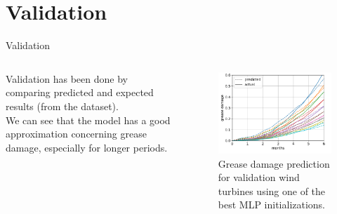 \documentclass[aspectratio=169,xcolor=dvipsnames]{beamer}
\begin{document}
\section{Validation}
\begin{frame}{Validation}
    \begin{columns}[T]
        \begin{column}{0.5\textwidth}
            \vspace{20pt}
            Validation has been done by comparing predicted and expected results (from the dataset). \\[10pt]
            We can see that the model has a good approximation concerning grease damage, especially for longer periods.
        \end{column}
        
        \begin{column}{0.5\textwidth}
            \begin{figure}
                \centering
                \includegraphics[width=\textwidth]{include/validation.png}
                \caption{Grease damage prediction for validation wind turbines using one of the best MLP initializations. \cite{YUCESAN2023110921}}
                \label{fig:validation}
            \end{figure}
        \end{column}
    \end{columns}
\end{frame}
\end{document}
